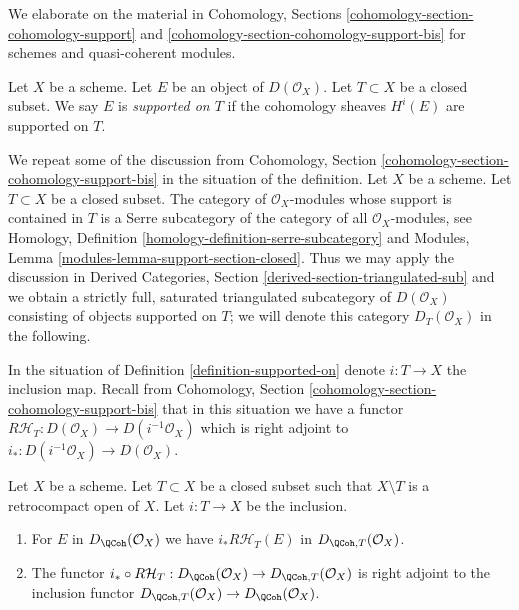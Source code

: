 \noindent
We elaborate on the material in Cohomology, Sections
\ref{cohomology-section-cohomology-support} and
\ref{cohomology-section-cohomology-support-bis} for schemes
and quasi-coherent modules.

\begin{definition}
\label{definition-supported-on}
Let $X$ be a scheme. Let $E$ be an object of $D(\mathcal{O}_X)$.
Let $T \subset X$ be a closed subset.
We say $E$ is {\it supported on $T$} if the
cohomology sheaves $H^i(E)$ are supported on $T$.
\end{definition}

\noindent
We repeat some of the discussion from
Cohomology, Section \ref{cohomology-section-cohomology-support-bis}
in the situation of the definition.
Let $X$ be a scheme. Let $T \subset X$ be a closed subset.
The category of $\mathcal{O}_X$-modules whose
support is contained in $T$ is a Serre subcategory of the
category of all $\mathcal{O}_X$-modules, see
Homology, Definition \ref{homology-definition-serre-subcategory}
and
Modules, Lemma \ref{modules-lemma-support-section-closed}.
Thus we may apply the discussion in
Derived Categories, Section \ref{derived-section-triangulated-sub}
and we obtain a strictly full, saturated triangulated subcategory of
$D(\mathcal{O}_X)$ consisting of objects supported on $T$; we will
denote this category $D_T(\mathcal{O}_X)$ in the following.

\medskip\noindent
In the situation of Definition \ref{definition-supported-on}
denote $i : T \to X$ the inclusion map. Recall from
Cohomology, Section \ref{cohomology-section-cohomology-support-bis}
that in this situation we have a functor
$R\mathcal{H}_T : D(\mathcal{O}_X) \to D(i^{-1}\mathcal{O}_X)$
which is right adjoint to $i_* : D(i^{-1}\mathcal{O}_X) \to D(\mathcal{O}_X)$.

\begin{lemma}
\label{lemma-support-quasi-coherent}
Let $X$ be a scheme. Let $T \subset X$ be a closed subset such that
$X \setminus T$ is a retrocompact open of $X$. Let $i : T \to X$ be
the inclusion.
\begin{enumerate}
\item For $E$ in $D_\QCoh(\mathcal{O}_X)$ we have
$i_*R\mathcal{H}_T(E)$ in $D_{\QCoh, T}(\mathcal{O}_X)$.
\item The functor
$i_* \circ R\mathcal{H}_T : D_\QCoh(\mathcal{O}_X) \to
D_{\QCoh, T}(\mathcal{O}_X)$ is right adjoint to the inclusion functor
$D_{\QCoh, T}(\mathcal{O}_X) \to D_\QCoh(\mathcal{O}_X)$.
\end{enumerate}
\end{lemma}

